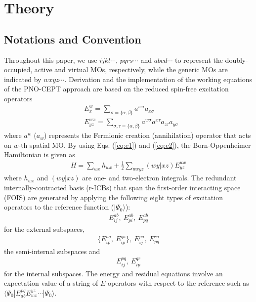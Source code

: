 \documentclass[aip,jcp,amsmath]{revtex4-1}
\begin{document}
\section{Theory}\label{Sec:theory}

\subsection{Notations and Convention}
%
Throughout this paper, we use $ijkl\cdots$, $pqrs\cdots$ and $abcd\cdots$ to represent the doubly-occupied, active and virtual MOs, respectively, while the generic MOs are indicated by $wxyz\cdots$.
%
Derivation and the implementation of the working equations of the PNO-CEPT approach are based on the reduced spin-free excitation operators\cite{PhysRevA.43.3392,PhysRevA.41.2391,doi:10.1063/1.448859,Kutzelnigg_Mukherjee1997}
%
\begin{align}
  &E^w_x = \sum_{\sigma=\{\alpha,\beta\}} a^{w\sigma}a_{x\sigma} \label{eq:e1} \\
  &E^{wx}_{yz} = \sum_{\sigma,\tau=\{\alpha,\beta\}} a^{w\sigma}a^{x\tau}a_{z\tau}a_{y\sigma} \label{eq:e2}
\end{align}
%
where $a^{w}$ ($a_w$) represents the Fermionic creation (annihilation) operator that acts on $w$-th spatial MO.
%
By using Eqs. (\ref{eq:e1}) and (\ref{eq:e2}), the Born-Oppenheimer Hamiltonian is given as
\begin{align}
  H=\sum_{wx} h_{wx} + \frac{1}{2}\sum_{wxyz} (wy|xz) E^{wx}_{yz}
\end{align}
%
where $h_{wx}$ and $(wy|xz)$ are one- and two-electron integrals.
%
The redundant internally-contracted basis (r-ICBs) that span the first-order interacting space (FOIS) are generated by applying the following eight types of excitation operators to the reference function ($|\Psi_0\rangle$):
%
\begin{align}
  E_{ij}^{ab},\ E_{pi}^{ab},\ E_{pq}^{ab} \label{eq:externalICB}
\end{align}
%
for the external subspaces,
%
\begin{align}
  \{E_{ip}^{aq},\ E_{ip}^{qa}\},\ E_{ij}^{pa},\ E_{pq}^{ra} \label{eq:semiinternalICB}
\end{align}
%
the semi-internal subspaces and
%
\begin{align}
  E_{ij}^{pq},\ E_{ip}^{qr} \label{eq:intternalICB}
\end{align}
%
for the internal subspaces.
%
The energy and residual equations involve an expectation value of a string of $E$-operators with respect to the reference such as $\langle\Psi_0|E^{pq}_{ab}E_{wx}^{yz}\cdots|\Psi_0\rangle$.
\end{document}
